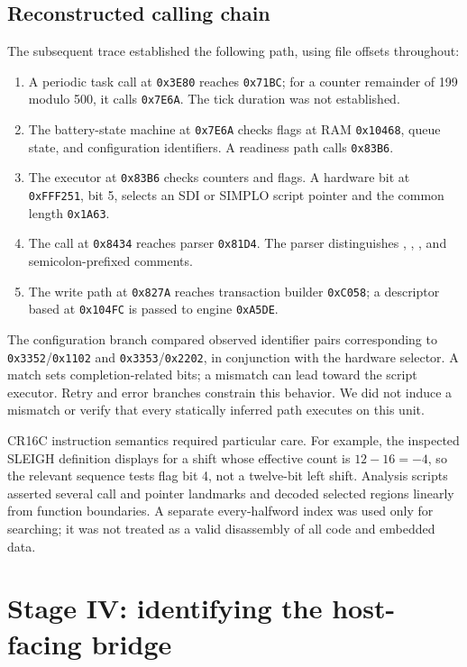 \documentclass[11pt,a4paper]{article}
\newcommand{\hex}[1]{\texttt{0x#1}}
\newcommand{\code}[1]{\texttt{\detokenize{#1}}}
\begin{document}
\subsection{Reconstructed calling chain}
The subsequent trace established the following path, using file offsets throughout:
\begin{enumerate}
\item A periodic task call at \hex{3E80} reaches \hex{71BC}; for a counter remainder of 199 modulo 500, it calls \hex{7E6A}. The tick duration was not established.
\item The battery-state machine at \hex{7E6A} checks flags at RAM \hex{10468}, queue state, and configuration identifiers. A readiness path calls \hex{83B6}.
\item The executor at \hex{83B6} checks counters and flags. A hardware bit at \hex{FFF251}, bit 5, selects an SDI or SIMPLO script pointer and the common length \hex{1A63}.
\item The call at \hex{8434} reaches parser \hex{81D4}. The parser distinguishes \code{W}, \code{C}, \code{X}, and semicolon-prefixed comments.
\item The write path at \hex{827A} reaches transaction builder \hex{C058}; a descriptor based at \hex{104FC} is passed to engine \hex{A5DE}.
\end{enumerate}

The configuration branch compared observed identifier pairs corresponding to \hex{3352}/\hex{1102} and \hex{3353}/\hex{2202}, in conjunction with the hardware selector. A match sets completion-related bits; a mismatch can lead toward the script executor. Retry and error branches constrain this behavior. We did not induce a mismatch or verify that every statically inferred path executes on this unit.

CR16C instruction semantics required particular care. For example, the inspected SLEIGH definition displays \code{LSHW $0xC} for a shift whose effective count is $12-16=-4$, so the relevant sequence tests flag bit 4, not a twelve-bit left shift. Analysis scripts asserted several call and pointer landmarks and decoded selected regions linearly from function boundaries. A separate every-halfword index was used only for searching; it was not treated as a valid disassembly of all code and embedded data.

\section{Stage IV: identifying the host-facing bridge}
\end{document}
